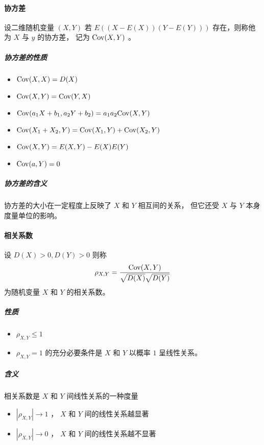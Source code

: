 \paragraph{协方差} 设二维随机变量 $ (X,Y) $ 若 $ E((X - E(X))(Y - E(Y))) $ 存在，则称他为 $ X $ 与 $ y $ 的协方差，
记为 $ \mathrm{Cov}(X,Y) $ 。
\subparagraph{协方差的性质}

\begin{itemize}[leftmargin=\subparitemindent]
    \item $ \mathrm{Cov}(X,X) = D(X) $
    \item $ \mathrm{Cov}(X,Y) = \mathrm{Cov}(Y,X) $
    \item $ \mathrm{Cov}(a_1 X + b_1, a_2 Y + b_2) = a_1 a_2 \mathrm{Cov}(X, Y) $
    \item $ \mathrm{Cov}(X_1 + X_2, Y) = \mathrm{Cov}(X_1, Y) + \mathrm{Cov}(X_2, Y) $
    \item $ \mathrm{Cov}(X,Y) = E(X,Y) - E(X)E(Y) $
    \item $ \mathrm{Cov}(a,Y) = 0 $
\end{itemize}

\subparagraph{协方差的含义} 协方差的大小在一定程度上反映了 $ X $ 和 $ Y $ 相互间的关系，
但它还受 $ X $ 与 $ Y $ 本身度量单位的影响。

\paragraph{相关系数} 设 $ D(X) > 0, D(Y) > 0 $ 则称
\begin{equation}
    \rho_{X,Y} = \frac{\mathrm{Cov}(X,Y)}{\sqrt{D(X)}\sqrt{D(Y)}}
\end{equation}
为随机变量 $ X $ 和 $ Y $ 的相关系数。

\subparagraph{性质} 
\begin{itemize}[leftmargin=\subparitemindent]
    \item $ \rho_{X,Y} \leqslant 1 $
    \item $ \rho_{X,Y} = 1 $ 的充分必要条件是 $ X $ 和 $ Y $ 以概率 $ 1 $ 呈线性关系。
\end{itemize}

\subparagraph{含义} 相关系数是 $ X $ 和 $ Y $ 间线性关系的一种度量
\begin{itemize}[leftmargin=\subparitemindent]
    \item $ \left| \rho_{X,Y} \right| \rightarrow 1 $ ， $ X $ 和 $ Y $ 间的线性关系越显著
    \item $ \left| \rho_{X,Y} \right| \rightarrow 0 $ ， $ X $ 和 $ Y $ 间的线性关系越不显著
\end{itemize}

